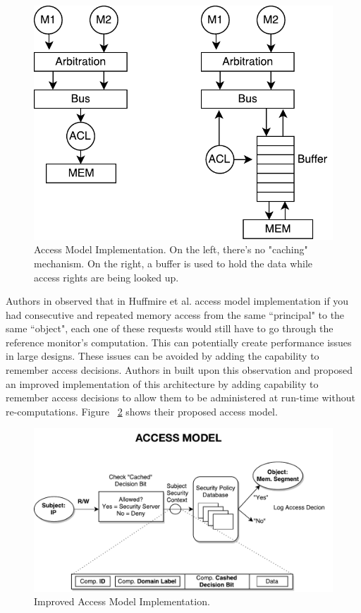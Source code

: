 \documentclass[sigconf]{acmart}
\theoremstyle{plain}
\theoremstyle{remark}
\begin{document}
\begin{figure}[hbt]
\centering
\includegraphics[width=0.75\columnwidth]{figures/ted_access.pdf}
\caption{Access Model Implementation. On the left, there's no "caching" mechanism. On the right, a buffer is used to hold the data while access rights are being looked up.} %
\label{fig:ted}
\end{figure}



Authors in \cite{FestusFCCM} observed that in Huffmire et al. access model implementation if you had consecutive and repeated memory access from the same ``principal" to the same ``object", each one of these requests would still have to go through the reference monitor's computation. This can potentially create performance issues in large designs. These issues can be avoided by adding the capability to remember access decisions. Authors in \cite{FestusFCCM} built upon this observation and proposed an improved implementation of this architecture by adding capability to remember access decisions to allow them to be administered at run-time without re-computations. Figure ~\ref{fig:access} shows their proposed access model.

\begin{figure}[hbt]
\centering
\includegraphics[width=1\columnwidth]{figures/access.pdf}
\caption{Improved Access Model Implementation.} %
\label{fig:access}
\end{figure}
\end{document}
